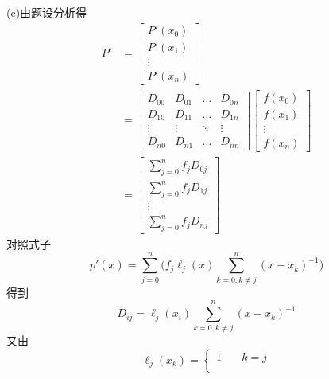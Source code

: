 \documentclass[12pt,a4paper,utf8]{ctexart}
\begin{document}
\begin{enumerate}
(c)由题设分析得
\begin{equation}
    \begin{aligned}
        P'  &=  \left[\begin{matrix}
                    P'(x_0) \\
                    P'(x_1) \\
                    \vdots \\
                    P'(x_n)
                \end{matrix}\right] \\
            &=  \left[\begin{matrix}
                D_{00} & D_{01} & \dots & D_{0n} \\
                D_{10} & D_{11} & \dots & D_{1n} \\
                \vdots & \vdots & \ddots & \vdots \\
                D_{n0} & D_{n1} & \dots & D_{nn}
                \end{matrix}\right] 
                \left[\begin{matrix}
                    f(x_0) \\
                    f(x_1) \\
                    \vdots \\
                    f(x_n)
                \end{matrix}\right] \\
            &=  \left[\begin{matrix}
                \sum_{j=0}^n f_jD_{0j} \\
                \sum_{j=0}^n f_jD_{1j} \\
                \vdots \\
                \sum_{j=0}^n f_jD_{nj}
                \end{matrix}\right]
    \end{aligned}
    \nonumber
\end{equation}
对照式子
\begin{equation}
    p'(x) = \sum_{j=0}^n \bigg(f_j\ell_j(x)\sum_{k=0,k\neq j}^n(x-x_k)^{-1}\bigg) \nonumber
\end{equation}
得到
\begin{equation}
    D_{ij} = \ell_j(x_i) \sum_{k=0,k\neq j}^n (x-x_k)^{-1} \nonumber
\end{equation}
又由
\begin{equation}
    \ell_j(x_k) = \left\{   \begin{aligned}
                                1&\quad k = j \\

\end{aligned}
\end{equation}
\end{enumerate}
\end{document}
